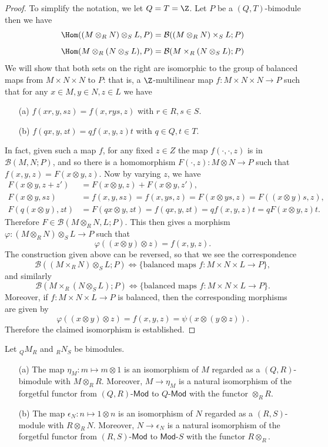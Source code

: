 \begin{proof}
To simplify the notation, we let $Q=T=\Z$. Let $P$ be a $(Q,T)$-bimodule then we have
\[\Hom((M\otimes_RN)\otimes_SL,P)=\mathcal{B}((M\otimes_RN)\times_SL;P)\]
\[\Hom(M\otimes_R(N\otimes_SL),P)=\mathcal{B}(M\times_R(N\otimes_SL);P)\]
We will show that both sets on the right are isomorphic to the group of  balanced maps from $M\times N\times N$ to $P$: that is, a $\Z$-multilinear map $f:M\times N\times N\to P$ such that for any $x\in M,y\in N,z\in L$ we have 
\begin{itemize}
\item[(a)] $f(xr,y,sz)=f(x,rys,z)$ with $r\in R,s\in S$.
\item[(b)] $f(qx,y,zt)=qf(x,y,z)t$ with $q\in Q,t\in T$.
\end{itemize}
In fact, given such a map $f$, for any fixed $z\in Z$ the map $f(\cdot,\cdot,z)$ is in $\mathcal{B}(M,N;P)$, and so there is a homomorphism $F(\cdot,z):M\otimes N\to P$ such that $f(x,y,z)=F(x\otimes y,z)$. Now by varying $z$, we have
\begin{align*}
F(x\otimes y,z+z')&=F(x\otimes y,z)+F(x\otimes y,z'),\\
F(x\otimes y,sz)&=f(x,y,sz)=f(x,ys,z)=F(x\otimes ys,z)=F((x\otimes y)s,z),\\
F(q(x\otimes y),zt)&=F(qx\otimes y,zt)=f(qx,y,zt)=qf(x,y,z)t=qF(x\otimes y,z)t.
\end{align*}
Therefore $F\in\mathcal{B}(M\otimes_RN,L;P)$. This then gives a morphism $\varphi:(M\otimes_RN)\otimes_SL\to P$ such that
\[\varphi((x\otimes y)\otimes z)=f(x,y,z).\]
The construction given above can be reversed, so that we see the correspondence
\[\mathcal{B}((M\times_RN)\otimes_SL;P)\Leftrightarrow\{\text{balanced maps $f:M\times N\times L\to P$}\},\]
and similarly
\[\mathcal{B}(M\times_R(N\otimes_SL);P)\Leftrightarrow\{\text{balanced maps $f:M\times N\times L\to P$}\}.\]
Moreover, if $f:M\times N\times L\to P$ is balanced, then the corresponding morphisms are given by
\[\varphi((x\otimes y)\otimes z)=f(x,y,z)=\psi(x\otimes(y\otimes z)).\]
Therefore the claimed isomorphism is established.
\end{proof}
\begin{proposition}\label{tensor product unit}
Let $_{Q}M_{R}$ and $_{R}N_{S}$ be bimodules.
\begin{itemize}
\item[(a)] The map $\eta_M:m\mapsto m\otimes 1$ is an isomorphism of $M$ regarded as a $(Q,R)$-bimodule with $M\otimes_RR$. Moreover, $M\to\eta_M$ is a natural isomorphism of the forgetful functor from $(Q,R)$-$\mathsf{Mod}$ to $Q$-$\mathsf{Mod}$ with the functor $\otimes_RR$.
\item[(b)] The map $\epsilon_N:n\mapsto 1\otimes n$ is an isomorphism of $N$ regarded as a $(R,S)$-module with $R\otimes_RN$. Moreover, $N\to\epsilon_N$ is a natural isomorphism of the forgetful functor from $(R,S)$-$\mathsf{Mod}$ to $\mathsf{Mod}$-$S$ with the functor $R\otimes_R$.
\end{itemize}
\end{proposition}
